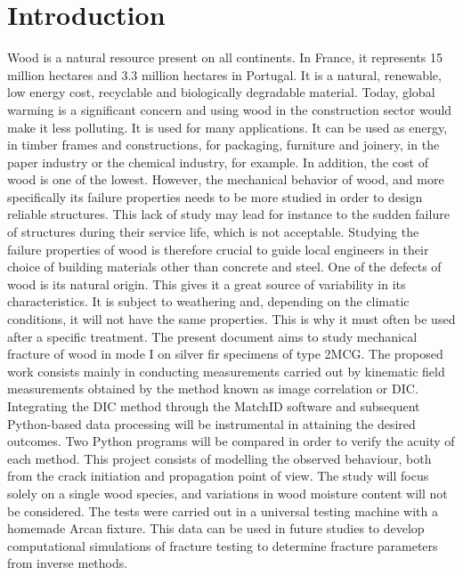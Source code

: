 \documentclass[3p,times,procedia]{elsarticle}
\begin{document}
\section{Introduction}\label{S:intro}

Wood is a natural resource present on all continents. In France, it represents 15 million hectares and 3.3 million hectares in Portugal. It is a natural, renewable, low energy cost, recyclable and biologically degradable material. Today, global warming is a significant concern and using wood in the construction sector would make it less polluting. It is used for many applications. It can be used as energy, in timber frames and constructions, for packaging, furniture and joinery, in the paper industry or the chemical industry, for example. In addition, the cost of wood is one of the lowest. However, the mechanical behavior of wood, and more specifically its failure properties needs to be more studied in order to design reliable structures. This lack of study may lead for instance to the sudden failure of structures during their service life, which is not acceptable. Studying the failure properties of wood is therefore crucial to guide local engineers in their choice of building materials other than concrete and steel. One of the defects of wood is its natural origin. This gives it a great source of variability in its characteristics. It is subject to weathering and, depending on the climatic conditions, it will not have the same properties. This is why it must often be used after a specific treatment.
The present document aims to study mechanical fracture of wood in mode I on silver fir specimens of type 2MCG. The proposed work consists mainly in conducting measurements carried out by kinematic field measurements obtained by the method known as image correlation or DIC. Integrating the DIC method through the MatchID software and subsequent Python-based data processing will be instrumental in attaining the desired outcomes. Two Python programs will be compared in order to verify the acuity of each method. This project consists of modelling the observed behaviour, both from the crack initiation and propagation point of view. The study will focus solely on a single wood species, and variations in wood moisture content will not be considered. The tests were carried out in a universal testing machine with a homemade Arcan fixture. This data can be used in future studies to develop computational simulations of fracture testing to determine fracture parameters from inverse methods.
\end{document}

